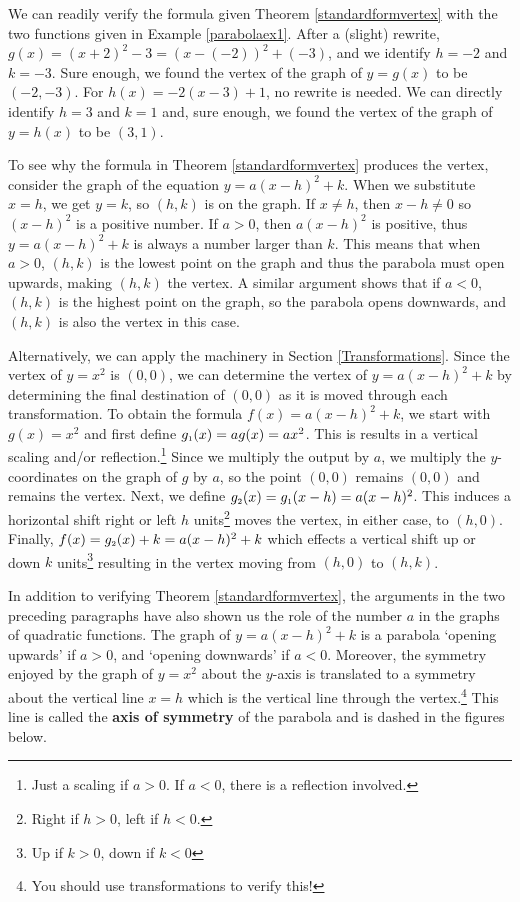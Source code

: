 \smallskip

We can readily verify the formula given Theorem \ref{standardformvertex} with the two functions given in Example \ref{parabolaex1}.  After a (slight) rewrite, $g(x) = (x+2)^2 - 3 = (x-(-2))^2+(-3)$, and we identify $h=-2$ and $k=-3$.  Sure enough, we found the vertex of the graph of $y=g(x)$ to be $(-2,-3)$. For $h(x) = -2(x-3)+1$, no rewrite is needed.  We can directly identify $h=3$ and $k=1$ and, sure enough, we found the vertex of the graph of $y=h(x)$ to be  $(3,1)$. 

\smallskip


To see why the formula in Theorem \ref{standardformvertex} produces the vertex, consider the graph of the equation $y = a(x-h)^2 + k$.  When we substitute $x=h$, we get $y=k$, so $(h,k)$ is on the graph.  If $x \neq h$, then $x-h \neq 0$ so $(x-h)^2$ is a positive number.  If $a>0$, then $a(x-h)^2$ is positive, thus $y = a(x-h)^2 + k$ is always a number larger than $k$.  This means that when $a>0$, $(h,k)$ is the lowest point on the graph and thus the parabola must open upwards, making $(h,k)$ the vertex.  A similar argument shows that if $a<0$, $(h,k)$ is the highest point on the graph, so the parabola opens downwards, and $(h,k)$ is also the vertex in this case.

\smallskip

Alternatively, we can apply the machinery in Section \ref{Transformations}. Since the vertex of $y = x^2$ is $(0,0)$, we can determine the vertex of $y = a(x-h)^2+k$ by determining the final destination of $(0,0)$ as it is moved through each transformation. To obtain the formula $f(x)= a(x-h)^2+k$, we start with $g(x)=x^2$ and first define $g_{\mbox{\tiny$1$}}(x) = a g(x) = ax^2$.  This is results in a  vertical scaling and/or reflection.\footnote{Just a scaling if $a>0$.  If $a<0$, there is a reflection involved.}  Since we multiply the output by $a$, we multiply the $y$-coordinates on the graph of $g$  by $a$, so the point $(0,0)$ remains $(0,0)$ and remains the vertex.  Next, we define $g_{\mbox{\tiny$2$}}(x) = g_{\mbox{\tiny$1$}}(x-h) = a(x-h)^2$.  This induces a horizontal shift right or left $h$ units\footnote{Right if $h>0$, left if $h<0$.} moves the vertex, in either case,  to $(h,0)$.  Finally, $f(x) = g_{\mbox{\tiny$2$}}(x)+k = a(x-h)^2+k$ which effects a vertical shift up or down $k$ units\footnote{Up if $k>0$, down if $k<0$} resulting in the vertex moving from $(h,0)$ to $(h,k)$.

\smallskip

In addition to verifying Theorem \ref{standardformvertex},  the arguments in the two preceding paragraphs have also shown us the role of the number $a$ in the graphs of quadratic functions. The graph of $y = a(x-h)^2 + k$ is a parabola `opening upwards' if $a > 0$, and `opening downwards' if $a < 0$. Moreover, the symmetry enjoyed by the graph of $y = x^2$ about the $y$-axis is translated to a symmetry about the vertical line $x=h$ which is the vertical line through the vertex.\footnote{You should use transformations to verify this!} This line is called the   \textbf{axis of symmetry} of the parabola and is dashed in the figures below.


